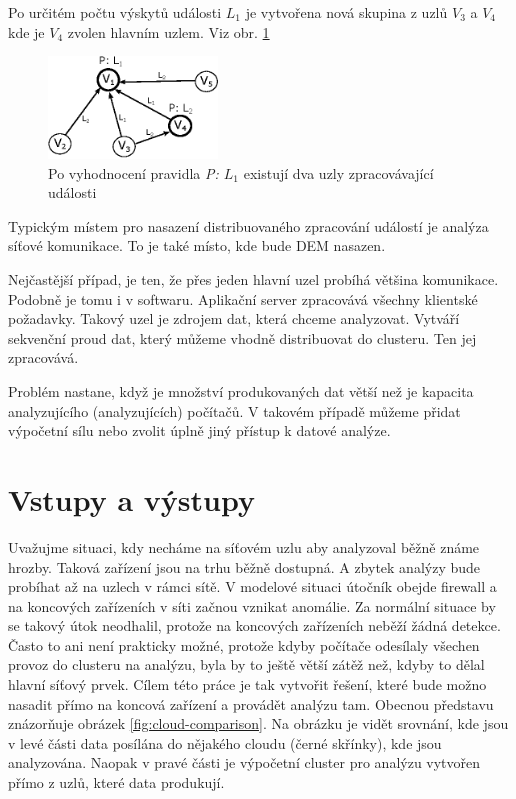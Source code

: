 \documentclass[
  digital, %
  table,   %
  nolof,     %
  nolot,     %
  oneside, %
  nocover,
  monochrome,
  12pt
]{fithesis3}
\begin{document}
Po určitém počtu výskytů události \textit{$L_1$} je vytvořena nová skupina z uzlů \textit{$V_3$} a \textit{$V_4$} kde je \textit{$V_4$} zvolen hlavním uzlem. Viz obr. \ref{fig:analysis_case_2}

\begin{figure}[H]
	\centering
    \includegraphics[width=0.4\textwidth, height=0.15\textheight]{images/analysis_case_2.eps}
    \caption{Po vyhodnocení pravidla \textit{P: $L_1$} existují dva uzly zpracovávající události}
    \label{fig:analysis_case_2}
\end{figure}

Typickým místem pro nasazení distribuovaného zpracování událostí je analýza síťové komunikace. To je také místo, kde bude DEM nasazen.

Nejčastější případ, je ten, že přes jeden hlavní uzel probíhá většina komunikace. Podobně je tomu i v softwaru. Aplikační server zpracovává všechny klientské požadavky. Takový uzel je zdrojem dat, která chceme analyzovat. Vytváří sekvenční proud dat, který můžeme vhodně distribuovat do clusteru. Ten jej zpracovává.

Problém nastane, když je množství produkovaných dat větší než je kapacita analyzujícího (analyzujících) počítačů. V takovém případě můžeme přidat výpočetní sílu nebo zvolit úplně jiný přístup k datové analýze.

\section{Vstupy a výstupy}
Uvažujme situaci, kdy necháme na síťovém uzlu aby analyzoval běžně známe hrozby. Taková zařízení jsou na trhu běžně dostupná. A zbytek analýzy bude probíhat až na uzlech v rámci sítě. V modelové situaci útočník obejde firewall a na koncových zařízeních v síti začnou vznikat anomálie. Za normální situace by se takový útok neodhalil, protože na koncových zařízeních neběží žádná detekce. Často to ani není prakticky možné, protože kdyby počítače odesílaly všechen provoz do clusteru na analýzu, byla by to ještě větší zátěž než, kdyby to dělal hlavní síťový prvek. Cílem této práce je tak vytvořit řešení, které bude možno nasadit přímo na koncová zařízení a provádět analýzu tam. Obecnou představu znázorňuje obrázek \ref{fig:cloud-comparison}. Na obrázku je vidět srovnání, kde jsou v levé části data posílána do nějakého cloudu (černé skřínky), kde jsou analyzována. Naopak v pravé části je výpočetní cluster pro analýzu vytvořen přímo z uzlů, které data produkují. 
\end{document}

